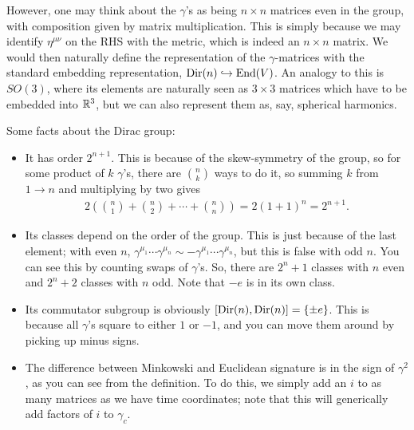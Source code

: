 \documentclass[11pt]{article}
\begin{document}
\begin{reemark}
    \noin
    However, one may think about the $\gamma$'s as being $n \times n$
    matrices even in the group, with composition given by matrix multiplication.
    This is simply because we may identify $\eta^{\mu \nu}$ on the RHS
    with the metric, which is indeed an $n \times n$ matrix. We would
    then naturally define the representation of the $\gamma$-matrices
    with the standard embedding representation, $\operatorname{Dir}(n) \hookrightarrow \operatorname{End}(V)$.
    An analogy to this is $SO(3)$, where its elements are naturally
    seen as $3 \times 3$ matrices which have to be embedded into $\mathbb{R}^3$,
    but we can also represent them as, say, spherical harmonics.
\end{reemark}


\noin
Some facts about the Dirac group:
\begin{itemize}
    \item It has order $2^{n + 1}$. This is because of the skew-symmetry of the group,
    so for some product of $k$ $\gamma$'s, there are ${n \choose k}$ ways to do it,
    so summing $k$ from $1 \to n$ and multiplying by two gives
    \begin{align*}
        2\left( {n \choose 1} + {n \choose 2} + \cdots + {n \choose n} \right) = 2 (1 + 1)^n = 2^{n + 1}.
    \end{align*}
    \item Its classes depend on the order of the group. This is just because of the last
    element; with even $n$, $\gamma^{\mu_1} \cdots \gamma^{\mu_n} \sim - \gamma^{\mu_1} \cdots \gamma^{\mu_n}$,
    but this is false with odd $n$. You can see this by counting swaps of $\gamma$'s.
    So, there are $2^n + 1$ classes with $n$ even and $2^n + 2$ classes with $n$ odd.
    Note that $-e$ is in its own class.
    \item Its commutator subgroup is obviously $[{\rm Dir}(n), {\rm Dir}(n)] = \{ \pm e \}$.
    This is because all $\gamma$'s square to either $1$ or $-1$, and you can move them
    around by picking up minus signs.
    \item The difference between Minkowski and Euclidean signature is in the sign
    of $\gamma^2$, as you can see from the definition. To do this, we simply
    add an $i$ to as many matrices as we have time coordinates; note that this will
    generically add factors of $i$ to $\gamma_c$.
\end{itemize}
\end{document}

